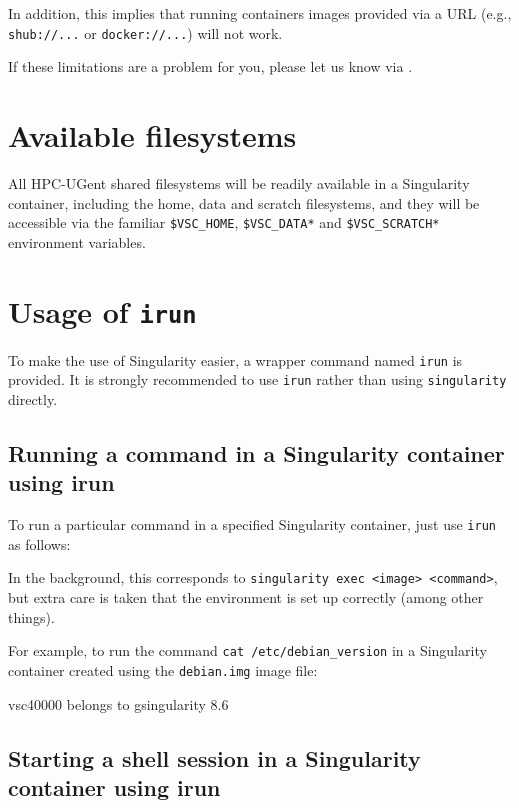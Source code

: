 In addition, this implies that running containers images provided via a URL
(e.g., \lstinline|shub://...| or \lstinline|docker://...|) will not work.

If these limitations are a problem for you, please let us know via \hpcinfo.

\section{Available filesystems}

All HPC-UGent shared filesystems will be readily available in a Singularity container,
including the home, data and scratch filesystems, and they will be accessible via the
familiar \lstinline|$VSC_HOME|, \lstinline|$VSC_DATA*| and \lstinline|$VSC_SCRATCH*| environment variables.

\section{Usage of \texttt{irun}}

To make the use of Singularity easier, a wrapper command named \lstinline|irun|
is provided. It is strongly recommended to use \lstinline|irun| rather than using \lstinline|singularity| directly.

\subsection{Running a command in a Singularity container using irun}

To run a particular command in a specified Singularity container, just use \lstinline|irun| as follows:

\begin{prompt}
\end{prompt}

In the background, this corresponds to \lstinline|singularity exec <image> <command>|,
but extra care is taken that the environment is set up correctly (among other things).

For example, to run the command \lstinline|cat /etc/debian_version| in a Singularity container
created using the \lstinline|debian.img| image file:

\begin{prompt}
vsc40000 belongs to gsingularity
8.6
\end{prompt}


\subsection{Starting a shell session in a Singularity container using irun}

